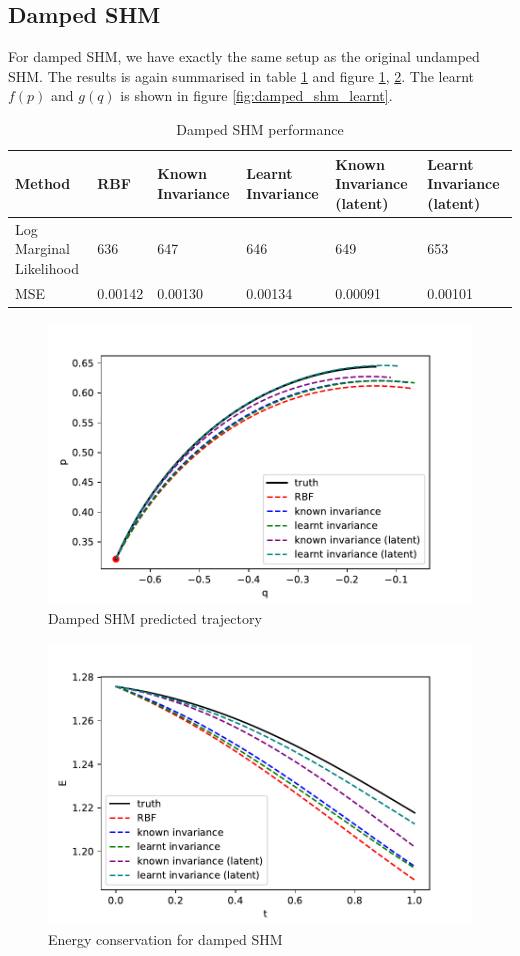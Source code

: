 \documentclass{statsmsc}
\begin{document}
\subsection{Damped SHM}
For damped SHM, we have exactly the same setup as the original undamped SHM.
The results is again summarised in table \ref{tab:damped_shm_performance} and figure \ref{fig:damped_shm_prediction}, \ref{fig:damped_shm_energy}.
The learnt $f(p)$ and $g(q)$ is shown in figure \ref{fig:damped_shm_learnt}.

\begin{table}[H]
  \centering
  \begin{tabular}{l l l l l l}
    \hline
Method           & RBF & Known Invariance&  Learnt Invariance & Known Invariance (latent) & Learnt Invariance (latent)\\
  \hline
Log Marginal Likelihood & 636 & 647 & 646 & 649 & 653 \\
MSE & 0.00142 & 0.00130 & 0.00134 & 0.00091 & 0.00101 \\
    \hline
  \end{tabular}
  \caption{Damped SHM performance}
  \label{tab:damped_shm_performance}
\end{table}

\begin{figure}[H]
        \centering
        \includegraphics[width=0.8\linewidth]{../codes/figures/damped_shm_predicted.pdf}
        \caption{Damped SHM predicted trajectory}
        \label{fig:damped_shm_prediction}
\end{figure}

\begin{figure}[H] 
  \includegraphics[width=0.8\linewidth]{../codes/figures/damped_shm_energy.pdf}
  \centering
  \caption{Energy conservation for damped SHM}
  \label{fig:damped_shm_energy}
\end{figure}
\end{document}
